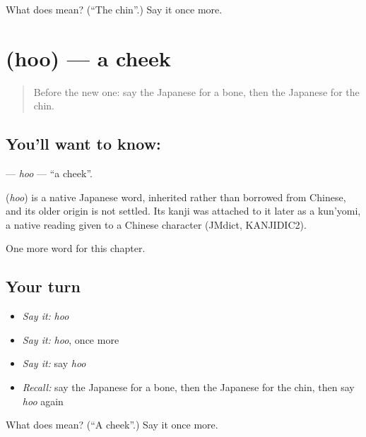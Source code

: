 \begin{tcolorbox}[breakable,colback=teal!4,colframe=teal!35!black,title={Before you move on}]
What does  mean? (\textquotedblleft{}The chin\textquotedblright{}.) Say it once more.
\end{tcolorbox}
\section[\texorpdfstring{\ja{ほお} (hoo)}{ほお (hoo)}]{ (hoo) — a cheek}

\label{lesson:JA-C21-hoo}



\begin{quote}
Before the new one: say the Japanese for a bone, then the Japanese for the chin.
\end{quote}

\subsection*{You'll want to know: }
\textbf{} — \emph{hoo} — \textquotedblleft{}a cheek\textquotedblright{}.

\begin{cousinweb}
\textbf{} (\emph{hoo}) is a native Japanese word, inherited rather than borrowed from Chinese, and its older origin is not settled. Its kanji was attached to it later as a kun'yomi, a native reading given to a Chinese character (JMdict, KANJIDIC2).
\end{cousinweb}

\begin{grammarlens}[title={What you've built}]
One more word for this chapter.
\end{grammarlens}

\subsection*{Your turn}
\begin{itemize}
\raggedright
  \item \emph{Say it:} \emph{hoo}
  \item \emph{Say it:} \emph{hoo}, once more
  \item \emph{Say it:} say \emph{hoo}
  \item \emph{Recall:} say the Japanese for a bone, then the Japanese for the chin, then say \emph{hoo} again
\end{itemize}

\begin{tcolorbox}[breakable,colback=teal!4,colframe=teal!35!black,title={Before you move on}]
What does  mean? (\textquotedblleft{}A cheek\textquotedblright{}.) Say it once more.
\end{tcolorbox}

